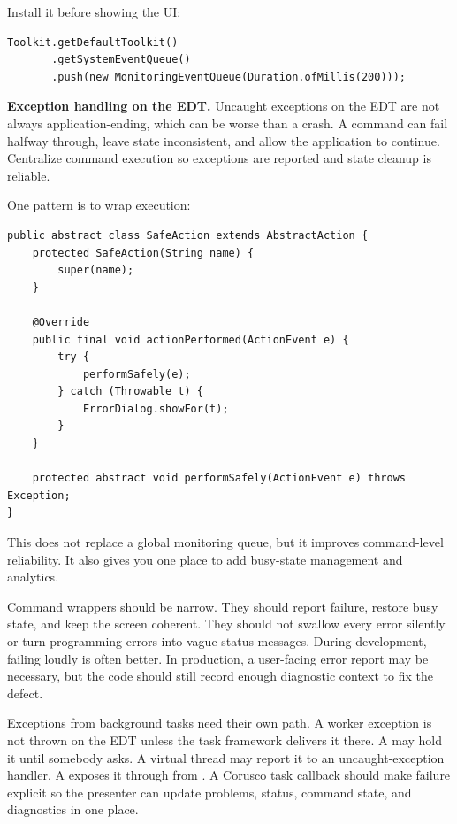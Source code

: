 Install it before showing the UI:

\begin{lstlisting}
Toolkit.getDefaultToolkit()
       .getSystemEventQueue()
       .push(new MonitoringEventQueue(Duration.ofMillis(200)));
\end{lstlisting}

\textbf{Exception handling on the EDT.} Uncaught exceptions on the EDT are not always application-ending, which can be worse than a crash. A command can fail halfway through, leave state inconsistent, and allow the application to continue. Centralize command execution so exceptions are reported and state cleanup is reliable.

One pattern is to wrap  execution:

\begin{lstlisting}[caption={A defensive action wrapper.}]
public abstract class SafeAction extends AbstractAction {
    protected SafeAction(String name) {
        super(name);
    }

    @Override
    public final void actionPerformed(ActionEvent e) {
        try {
            performSafely(e);
        } catch (Throwable t) {
            ErrorDialog.showFor(t);
        }
    }

    protected abstract void performSafely(ActionEvent e) throws Exception;
}
\end{lstlisting}

This does not replace a global monitoring queue, but it improves command-level reliability. It also gives you one place to add busy-state management and analytics.

Command wrappers should be narrow. They should report failure, restore busy state, and keep the screen coherent. They should not swallow every error silently or turn programming errors into vague status messages. During development, failing loudly is often better. In production, a user-facing error report may be necessary, but the code should still record enough diagnostic context to fix the defect.

Exceptions from background tasks need their own path. A worker exception is not thrown on the EDT unless the task framework delivers it there. A  may hold it until somebody asks. A virtual thread may report it to an uncaught-exception handler. A  exposes it through  from . A Corusco task callback should make failure explicit so the presenter can update problems, status, command state, and diagnostics in one place.

